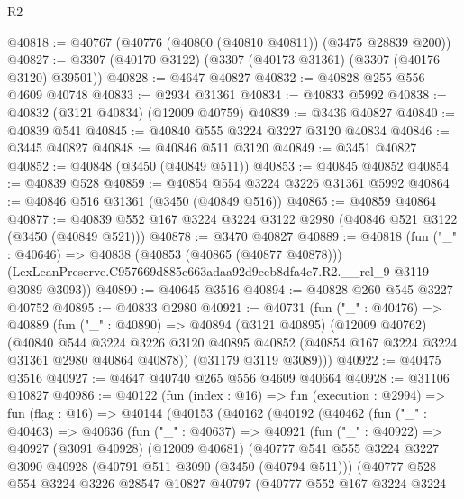 \begin{lexlean}{R2}
\begin{coremodule}
@40818 := @40767 (@40776 (@40800 (@40810 @40811)) (@3475 @28839 @200))
@40827 := @3307 (@40170 @3122) (@3307 (@40173 @31361) (@3307 (@40176 @3120) @39501))
@40828 := @4647 @40827
@40832 := @40828 @255 @556 @4609 @40748
@40833 := @2934 @31361
@40834 := @40833 @5992
@40838 := @40832 (@3121 @40834) (@12009 @40759)
@40839 := @3436 @40827
@40840 := @40839 @541
@40845 := @40840 @555 @3224 @3227 @3120 @40834
@40846 := @3445 @40827
@40848 := @40846 @511 @3120
@40849 := @3451 @40827
@40852 := @40848 (@3450 (@40849 @511))
@40853 := @40845 @40852
@40854 := @40839 @528
@40859 := @40854 @554 @3224 @3226 @31361 @5992
@40864 := @40846 @516 @31361 (@3450 (@40849 @516))
@40865 := @40859 @40864
@40877 := @40839 @552 @167 @3224 @3224 @3122 @2980 (@40846 @521 @3122 (@3450 (@40849 @521)))
@40878 := @3470 @40827
@40889 := @40818
    (fun ("_" : @40646) =>
    @40838
      (@40853 (@40865 (@40877 @40878)))
      (LexLeanPreserve.C957669d885c663adaa92d9eeb8dfa4c7.R2.__rel_9 @3119 @3089 @3093))
@40890 := @40645 @3516
@40894 := @40828 @260 @545 @3227 @40752
@40895 := @40833 @2980
@40921 := @40731
    (fun ("_" : @40476) =>
    @40889
      (fun ("_" : @40890) =>
      @40894
        (@3121 @40895)
        (@12009 @40762)
        (@40840
          @544
          @3224
          @3226
          @3120
          @40895
          @40852
          (@40854 @167 @3224 @3224 @31361 @2980 @40864 @40878))
        (@31179 @3119 @3089)))
@40922 := @40475 @3516
@40927 := @4647 @40740 @265 @556 @4609 @40664
@40928 := @31106 @10827
@40986 := @40122
    (fun (index : @16) =>
    fun (execution : @2994) =>
    fun (flag : @16) =>
    @40144
      (@40153
        (@40162
          (@40192
            (@40462
              (fun ("_" : @40463) =>
              @40636
                (fun ("_" : @40637) =>
                @40921
                  (fun ("_" : @40922) =>
                  @40927
                    (@3091 @40928)
                    (@12009 @40681)
                    (@40777
                      @541
                      @555
                      @3224
                      @3227
                      @3090
                      @40928
                      (@40791 @511 @3090 (@3450 (@40794 @511)))
                      (@40777
                        @528
                        @554
                        @3224
                        @3226
                        @28547
                        @10827
                        @40797
                        (@40777
                          @552
                          @167
                          @3224
                          @3224

\end{coremodule}
\end{lexlean}
